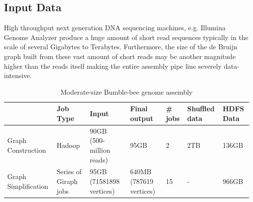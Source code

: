 \documentclass[conference]{IEEEtran}
\begin{document}
\subsection {Input Data} \label{InputData}
High throughput next generation DNA sequencing machines, e.g. Illumina Genome Analyzer produce a huge amount of short read sequences typically in the scale of several Gigabytes to Terabytes.
Furthermore, the size of the de Bruijn graph built from these vast amount of short reads may be another magnitude higher than the reads itself making the entire assembly pipe line severely data-intensive.
\begin{table}
\begin{center}
    \begin{tabular}{ |p{1.1cm} | p{0.8cm} | p{1.1cm} | p{0.8cm} | p{0.8cm} | p{0.8cm} | p{0.8cm}|} \hline
    & Job Type & Input & Final output & \# jobs & Shuffled data & HDFS Data \\ \hline
    Graph Construction & Hadoop & 90GB (500-million reads) & 95GB & 2 & 2TB & 136GB \\ \hline
    Graph Simplification & Series of Giraph jobs & 95GB (71581898 vertices) & 640MB (787619 vertices) & 15 & - & 966GB \\ \hline
    \end{tabular}
    \caption{Moderate-size Bumble-bee genome assembly}
	\label{table:BumbleBeeData}
\end{center}
\vspace{-2.3em}
\end{table}
\end{document}
